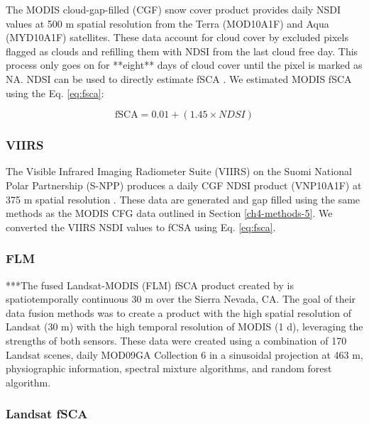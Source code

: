 The MODIS cloud-gap-filled (CGF) snow cover product \citep{hallEvaluationMODISVIIRS2019} provides daily NSDI values at 500 m spatial resolution from the Terra (MOD10A1F) and Aqua (MYD10A1F) satellites. These data account for cloud cover by excluded pixels  flagged as clouds and refilling them with NDSI from the last cloud free day. This process only goes on for **eight** days of cloud cover until the pixel is marked as NA. NDSI can be used to directly estimate fSCA \citep{salomonsonEstimatingFractionalSnow2004, salomonsonDevelopmentAquaMODIS2006,stillingerLandsatMODISVIIRS2023}. We estimated MODIS fSCA using the Eq. \ref{eq:fsca}:

\begin{equation}
\text{fSCA} = 0.01 + (1.45 \times NDSI)
\label{eq:fsca}
\end{equation}


\hypertarget{ch4-methods-6}{\subsubsection{VIIRS}\label{ch4-methods-6}}

The Visible Infrared Imaging Radiometer Suite (VIIRS) on the Suomi National Polar Partnership (S-NPP) produces a daily CGF NDSI product (VNP10A1F) at 375 m spatial resolution \citep{hallEvaluationMODISVIIRS2019}. These data are generated and gap filled using the same methods as the MODIS CFG data outlined in Section \ref{ch4-methods-5}. We converted the VIIRS NSDI values to fCSA using Eq. \ref{eq:fsca}.


\hypertarget{ch4-methods-7}{\subsubsection{FLM}\label{ch4-methods-7}}

***The fused Landsat-MODIS (FLM) fSCA product created by \cite{rittgerMultisensorFusionUsing2021} is spatiotemporally continuous 30 m over the Sierra Nevada, CA. The goal of their data fusion methods was to create a product with the high spatial resolution of Landsat (30 m) with the high temporal resolution of MODIS (1 d), leveraging the strengths of both sensors. These data were created using a combination of 170 Landsat scenes, daily MOD09GA Collection 6 in a sinusoidal projection at 463 m, physiographic information, spectral mixture algorithms, and random forest algorithm. 

\hypertarget{ch4-methods-8}{\subsubsection{Landsat fSCA}\label{ch4-methods-8}}

